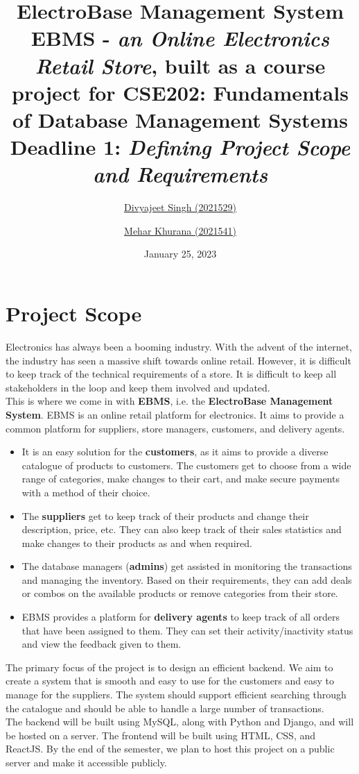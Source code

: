 \documentclass[12pt]{report}
\title{
    \textbf{\Huge ElectroBase Management System} \\
    \vspace*{15pt}
    \large{
        EBMS - \textit{an Online Electronics Retail Store}, built as a course project for
        \normalsize{CSE202: Fundamentals of Database Management Systems} \\
    }
    \vspace*{25pt}
    \textbf{Deadline 1:} \textit{Defining Project Scope and Requirements}
    \vspace*{5pt}
}
\author{
    \href{mailto:divyajeet21529@iiitd.ac.in}{Divyajeet Singh (2021529)}
    \and
    \href{mailto:mehar21541@iiitd.ac.in}{Mehar Khurana (2021541)}
}
\date{\vspace*{10pt} January 25, 2023}
\begin{document}
    \maketitle

    \section*{\Huge Project Scope}
    \vspace*{10pt}
    Electronics has always been a booming industry.
    With the advent of the internet, the industry has seen a massive shift towards online retail.
    However, it is difficult to keep track of the technical requirements of a store.
    It is difficult to keep all stakeholders in the loop and keep them involved and updated.
    \vspace*{10pt} \\
    This is where we come in with \textbf{EBMS}, i.e. the \textbf{ElectroBase Management System}.
    EBMS is an online retail platform for electronics.
    It aims to provide a common platform for suppliers, store managers, customers, and delivery agents.
    \begin{itemize}
        \item
        It is an easy solution for the \textbf{customers}, as it aims to provide a diverse catalogue of products to customers.
        The customers get to choose from a wide range of categories, make changes to their cart, and make secure payments with a method of their choice.
        \item
        The \textbf{suppliers} get to keep track of their products and change their description, price, etc.
        They can also keep track of their sales statistics and make changes to their products as and when required.
        \item
        The database managers (\textbf{admins}) get assisted in monitoring the transactions and managing the inventory.
        Based on their requirements, they can add deals or combos on the available products or remove categories from their store.
        \item
        EBMS provides a platform for \textbf{delivery agents} to keep track of all orders that have been assigned to them. They can set their activity/inactivity status and view the feedback given to them.
    \end{itemize}
    The primary focus of the project is to design an efficient backend.
    We aim to create a system that is smooth and easy to use for the customers and easy to manage for the suppliers.
    The system should support efficient searching through the catalogue and should be able to handle a large number of transactions.
    \vspace*{10pt} \\
    The backend will be built using MySQL, along with Python and Django, and will be hosted on a server.
    The frontend will be built using HTML, CSS, and ReactJS.
    By the end of the semester, we plan to host this project on a public server and make it accessible publicly.
\end{document}
